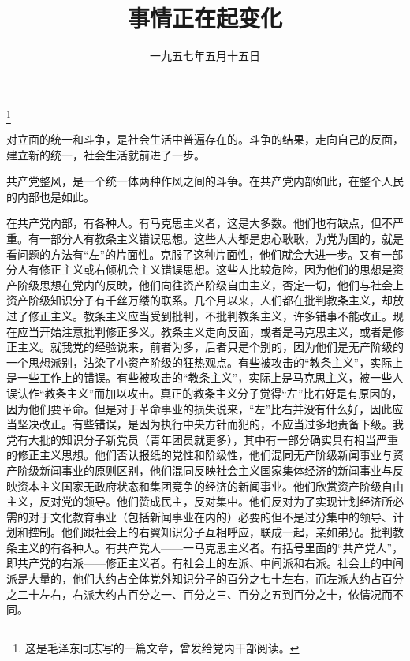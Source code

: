 
\title{事情正在起变化}
\date{一九五七年五月十五日}
\thanks{这是毛泽东同志写的一篇文章，曾发给党内干部阅读。}
\maketitle


对立面的统一和斗争，是社会生活中普遍存在的。斗争的结果，走向自己的反面，建立新的统一，社会生活就前进了一步。

共产党整风，是一个统一体两种作风之间的斗争。在共产党内部如此，在整个人民的内部也是如此。

在共产党内部，有各种人。有马克思主义者，这是大多数。他们也有缺点，但不严重。有一部分人有教条主义错误思想。这些人大都是忠心耿耿，为党为国的，就是看问题的方法有“左”的片面性。克服了这种片面性，他们就会大进一步。又有一部分人有修正主义或右倾机会主义错误思想。这些人比较危险，因为他们的思想是资产阶级思想在党内的反映，他们向往资产阶级自由主义，否定一切，他们与社会上资产阶级知识分子有千丝万缕的联系。几个月以来，人们都在批判教条主义，却放过了修正主义。教条主义应当受到批判，不批判教条主义，许多错事不能改正。现在应当开始注意批判修正多义。教条主义走向反面，或者是马克思主义，或者是修正主义。就我党的经验说来，前者为多，后者只是个别的，因为他们是无产阶级的一个思想派别，沾染了小资产阶级的狂热观点。有些被攻击的“教条主义”，实际上是一些工作上的错误。有些被攻击的“教条主义”，实际上是马克思主义，被一些人误认作“教条主义”而加以攻击。真正的教条主义分子觉得“左”比右好是有原因的，因为他们要革命。但是对于革命事业的损失说来，“左”比右并没有什么好，因此应当坚决改正。有些错误，是因为执行中央方针而犯的，不应当过多地责备下级。我党有大批的知识分子新党员（青年团员就更多），其中有一部分确实具有相当严重的修正主义思想。他们否认报纸的党性和阶级性，他们混同无产阶级新闻事业与资产阶级新闻事业的原则区别，他们混同反映社会主义国家集体经济的新闻事业与反映资本主义国家无政府状态和集团竞争的经济的新闻事业。他们欣赏资产阶级自由主义，反对党的领导。他们赞成民主，反对集中。他们反对为了实现计划经济所必需的对于文化教育事业（包括新闻事业在内的）必要的但不是过分集中的领导、计划和控制。他们跟社会上的右翼知识分子互相呼应，联成一起，亲如弟兄。批判教条主义的有各种人。有共产党人——一马克思主义者。有括号里面的“共产党人”，即共产党的右派——修正主义者。有社会上的左派、中间派和右派。社会上的中间派是大量的，他们大约占全体党外知识分子的百分之七十左右，而左派大约占百分之二十左右，右派大约占百分之一、百分之三、百分之五到百分之十，依情况而不同。

